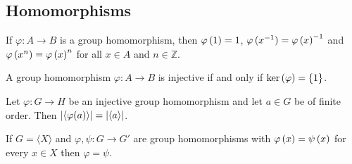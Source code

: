 \subsection{Homomorphisms}

\begin{proposition}
	If $\varphi: A \to B$ is a group homomorphism, then $\varphi\del{1} = 1$, $\varphi\del[0]{x^{-1}} = \varphi\del{x}^{-1}$ and $\varphi\del[0]{x^n} = \varphi\del{x}^n$ for all $x \in A$ and $n \in \mathbb{Z}$.
\end{proposition}

\vspace{2mm}

\begin{proposition}
	A group homomorphism $\varphi: A \to B$ is injective if and only if $\ker\del{\varphi} = \cbr{1}$.
\end{proposition}

\vspace{2mm}

\begin{lemma}
	Let $\varphi: G \to H$ be an injective group homomorphism and let $a \in G$ be of finite order. Then $\abs[0]{\langle\varphi(a)\rangle} = \abs[0]{\langle a \rangle}$.	
\end{lemma}

\vspace{2mm}

\begin{proposition}
	If $G = \langle X \rangle$ and $\varphi, \psi: G \to G'$ are group homomorphisms with $\varphi\del{x} = \psi\del{x}$ for every $x \in X$ then $\varphi = \psi$. 
\end{proposition}

\vspace{2mm}


